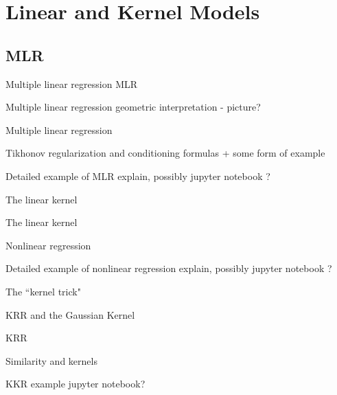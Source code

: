 \section{Linear and Kernel Models}
\subsection{MLR}
\begin{frame}{Multiple linear regression}
MLR
\end{frame}
\begin{frame}{Multiple linear regression}
geometric interpretation - picture?
\end{frame}
\begin{frame}{Multiple linear regression}

\end{frame}
\begin{frame}{Tikhonov regularization and conditioning}
formulas + some form of example
\end{frame}
\begin{frame}{Detailed example of MLR}
explain, possibly jupyter notebook ?
\end{frame}
\begin{frame}{The linear kernel}

\end{frame}
\begin{frame}{The linear kernel}

\end{frame}
\begin{frame}{Nonlinear regression}

\end{frame}
\begin{frame}{Detailed example of nonlinear regression}
explain, possibly jupyter notebook ?
\end{frame}
\begin{frame}{The ``kernel trick"}

\end{frame}
\begin{frame}{KRR and the Gaussian Kernel}

\end{frame}
\begin{frame}{KRR}

\end{frame}
\begin{frame}{Similarity and kernels}

\end{frame}
\begin{frame}{KKR example}
jupyter notebook?
\end{frame}
